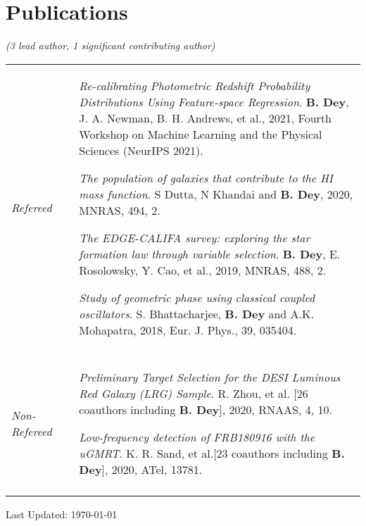 \documentclass[10pt,a4paper,roman]{moderncv} %
\begin{document}

\section{Publications}
\begin{center}
    \textit{(3 lead author, 1 significant contributing author)\\}
\end{center}

\begin{tabular}{m{2.4cm} |m{0.3cm} m{15cm}}
 \emph{Refereed} & &  \begin{etaremune}
    \item \textrm{\textit{Re-calibrating Photometric Redshift Probability Distributions Using Feature-space Regression}}. \textbf{B. Dey}, J. A. Newman, B. H. Andrews, et al., 2021, Fourth Workshop on Machine Learning and the Physical Sciences (NeurIPS 2021).
    \item \textrm{\textit{The population of galaxies that contribute to the HI mass function}}. S Dutta, N Khandai and \textbf{B. Dey}, 2020, MNRAS, 494, 2.
    \item \textrm{\textit{The EDGE-CALIFA survey: exploring the star formation law through variable selection}}. \textbf{B. Dey}, E. Rosolowsky, Y. Cao, et al., 2019, MNRAS, 488, 2.
    \item \textrm{\textit{Study of geometric phase using classical coupled oscillators}}. S. Bhattacharjee, \textbf{B. Dey} and A.K. Mohapatra, 2018, Eur. J. Phys., 39, 035404.
\end{etaremune}
 
 
 
 \\\multicolumn{2}{c}{} \\
 \emph{Non-Refereed} & &
 \begin{etaremune}
    \item \textrm{\textit{Preliminary Target Selection for the DESI Luminous Red Galaxy (LRG) Sample}}. R. Zhou, et al. [26 coauthors including \textbf{B. Dey}], 2020, RNAAS, 4, 10.
    \item \textrm{\textit{Low-frequency detection of FRB180916 with the uGMRT}}. K. R. Sand, et al.[23 coauthors including \textbf{B. Dey}], 2020, ATel, 13781.
\end{etaremune}
 \\\multicolumn{2}{c}{} \\

\end{tabular}

\begin{center}
    Last Updated: \today
\end{center}
\end{document}
